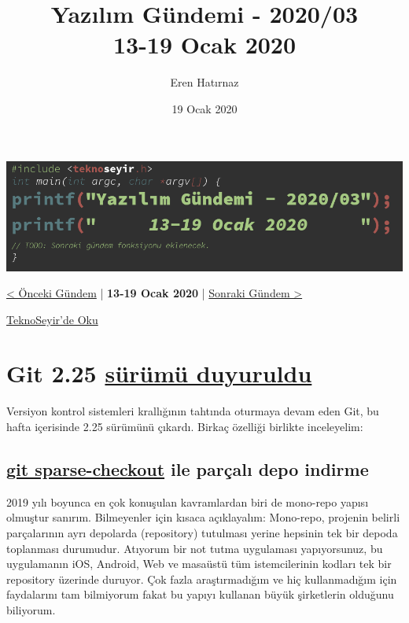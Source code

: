 \documentclass[11pt]{article}
\author{Eren Hatırnaz}
\date{19 Ocak 2020}
\title{Yazılım Gündemi - 2020/03\\\medskip
\large 13-19 Ocak 2020}
\begin{document}
\maketitle
\tableofcontents \clearpage\shorthandoff{=}

\begin{center}
\includegraphics[width=.9\linewidth]{gorseller/yazilim-gundemi-banner.png}
\end{center}

\begin{center}
\href{../02/yazilim-gundemi-2020-02.pdf}{< Önceki Gündem} | \textbf{13-19 Ocak 2020} | \href{../04/yazilim-gundemi-2020-04.pdf}{Sonraki Gündem >}

\href{https://teknoseyir.com/blog/yazilim-gundemi-2020-03}{TeknoSeyir'de Oku}
\end{center}

\section{Git 2.25 \href{https://lore.kernel.org/git/xmqqtv4zjgv5.fsf@gitster-ct.c.googlers.com/}{sürümü duyuruldu}}
\label{sec:org16ca78a}
Versiyon kontrol sistemleri krallığının tahtında oturmaya devam eden Git, bu
hafta içerisinde 2.25 sürümünü çıkardı. Birkaç özelliği birlikte inceleyelim:
\subsection{\href{https://git-scm.com/docs/git-sparse-checkout}{git sparse-checkout} ile parçalı depo indirme}
\label{sec:org3db7648}
2019 yılı boyunca en çok konuşulan kavramlardan biri de mono-repo yapısı
olmuştur sanırım. Bilmeyenler için kısaca açıklayalım: Mono-repo, projenin
belirli parçalarının ayrı depolarda (repository) tutulması yerine hepsinin tek
bir depoda toplanması durumudur. Atıyorum bir not tutma uygulaması
yapıyorsunuz, bu uygulamanın iOS, Android, Web ve masaüstü tüm istemcilerinin
kodları tek bir repository üzerinde duruyor. Çok fazla araştırmadığım ve hiç
kullanmadığım için faydalarını tam bilmiyorum fakat bu yapıyı kullanan büyük
şirketlerin olduğunu biliyorum.
\end{document}
